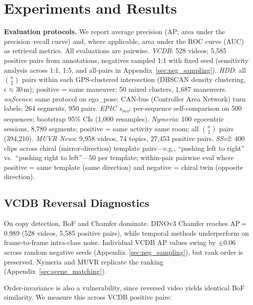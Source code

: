 \documentclass{article}
\theoremstyle{remark}
\begin{document}
\section{Experiments and Results}

\textbf{Evaluation protocols.} We report average precision (AP; area under the precision--recall curve) and, where applicable, area under the ROC curve (AUC) as retrieval metrics. All evaluations are pairwise. \emph{VCDB}: 528 videos; 5{,}585 positive pairs from annotations, negatives sampled 1:1 with fixed seed (sensitivity analysis across 1:1, 1:5, and all-pairs in Appendix~\ref{sec:neg_sampling}). \emph{HDD}: all $\binom{n}{2}$ pairs within each GPS-clustered intersection (DBSCAN density clustering, $\epsilon\!\approx\!30$\,m); positive = same maneuver; 50 mixed clusters, 1{,}687 maneuvers. \emph{nuScenes}: same protocol on ego\_pose; CAN-bus (Controller Area Network) turn labels; 264 segments, 950 pairs. \emph{EPIC s\textsubscript{rev}}: per-sequence self-comparison on 500 sequences; bootstrap 95\% CIs (1{,}000 resamples). \emph{Nymeria}: 100 egocentric sessions, 8{,}780 segments; positive = same activity same room; all $\binom{n}{2}$ pairs (394{,}210). \emph{MUVR News}: 9{,}958 videos, 74 topics, 27{,}453 positive pairs. \emph{SSv2}: 400 clips across chiral (mirror-direction) template pairs---e.g., ``pushing left to right'' vs.\ ``pushing right to left''---50 per template; within-pair pairwise eval where positive = same template (same direction) and negative = chiral twin (opposite direction).

\subsection{VCDB Reversal Diagnostics}

On copy detection, BoF and Chamfer dominate. DINOv3 Chamfer reaches AP\,=\,0.989 (528 videos, 5{,}585 positive pairs), while temporal methods underperform on frame-to-frame intra-class noise. Individual VCDB AP values swing by ${\pm}0.06$ across random negative seeds (Appendix~\ref{sec:neg_sampling}), but rank order is preserved. Nymeria and MUVR replicate the ranking (Appendix~\ref{sec:scene_matching}).

Order-invariance is also a vulnerability, since reversed video yields identical BoF similarity. We measure this across VCDB positive pairs:
\end{document}

